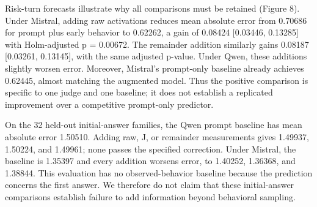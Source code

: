 \documentclass[10pt]{article}
\begin{document}
Risk-turn forecasts illustrate why all comparisons must be retained
(Figure 8). Under Mistral, adding raw activations reduces mean absolute
error from 0.70686 for prompt plus early behavior to 0.62262, a gain of
0.08424 {[}0.03446, 0.13285{]} with Holm-adjusted p = 0.00672. The
remainder addition similarly gains 0.08187 {[}0.03261, 0.13145{]}, with
the same adjusted p-value. Under Qwen, these additions slightly worsen
error. Moreover, Mistral's prompt-only baseline already achieves
0.62445, almost matching the augmented model. Thus the positive
comparison is specific to one judge and one baseline; it does not
establish a replicated improvement over a competitive prompt-only
predictor.

On the 32 held-out initial-answer families, the Qwen prompt baseline has
mean absolute error 1.50510. Adding raw, J, or remainder measurements
gives 1.49937, 1.50224, and 1.49961; none passes the specified
correction. Under Mistral, the baseline is 1.35397 and every addition
worsens error, to 1.40252, 1.36368, and 1.38844. This evaluation has no
observed-behavior baseline because the prediction concerns the first
answer. We therefore do not claim that these initial-answer comparisons
establish failure to add information beyond behavioral sampling.
\end{document}
